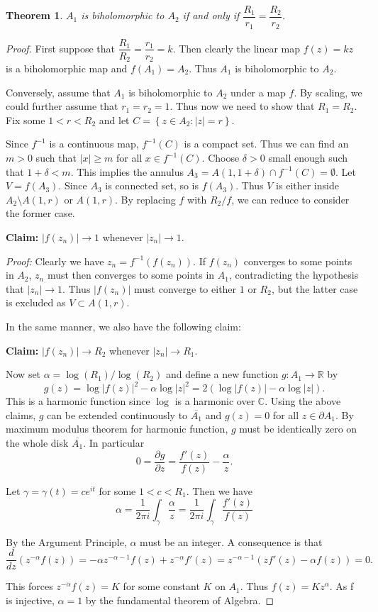 \documentclass[12pt]{article} %
\newtheorem{theorem}{Theorem}
\begin{document}
\begin{theorem}
  $A_1$ is biholomorphic to $A_2$ if and only if $\dfrac{R_1}{r_1} = \dfrac{R_2}{r_2}$.
\end{theorem}
\begin{proof}
  First suppose that $\dfrac{R_1}{R_2} = \dfrac{r_1}{r_2} =k$. Then clearly the linear map $f(z)=kz$
  is a biholomorphic map and $f(A_1) = A_2$. Thus $A_1$ is biholomorphic to $A_2$.

  Conversely, assume that $A_1$ is biholomorphic to $A_2$ under a map $f$. By scaling, we could further assume that $r_1=r_2=1$. Thus now we need to show that $R_1=R_2$.
  Fix some $1<r<R_2$ and let $C = \left\lbrace z \in A_2 \colon |z|=r\right\rbrace$.

  Since $f^{-1}$ is a continuous map, $f^{-1}(C)$ is a compact set. Thus we can find
  an $m>0$ such that $|x| \ge m$ for all $x \in f^{-1}(C)$. Choose $\delta>0$ small enough
  such that $1+\delta<m$. This implies the annulus $A_3 = A(1,1+\delta) \cap f^{-1}(C)=\emptyset$. Let
  $V = f(A_3)$. Since $A_3$ is connected set, so is $f(A_3)$. Thus $V$ is either inside
  $A_2\setminus A(1,r)$ or $A(1,r)$. By replacing $f$ with $R_2/f$, we can reduce to consider the former case.

  \textbf{Claim:} $|f(z_n)| \to 1$ whenever $|z_n| \to 1$.

  \textit{Proof:} Clearly we have $z_n = f^{-1}(f(z_n))$. If $f(z_n)$ converges to some points
  in $A_2$, $z_n$ must then converges to some points in $A_1$, contradicting the hypothesis that
  $|z_n| \to 1$. Thus $|f(z_n)|$ must converge to either $1$ or $R_2$, but the latter case is excluded as $V \subset A(1,r)$.

  In the same manner, we also have the following claim:

  \textbf{Claim:} $|f(z_n)| \to R_2$ whenever $|z_n| \to R_1$.

  Now set $\alpha = \log(R_1)/\log(R_2)$ and define a new function $g \colon A_1 \to \mathbb{R}$ by
  \[g(z) = \log|f(z)|^2 - \alpha\log|z|^2 = 2(\log|f(z)| - \alpha\log|z|).\]
  This is a harmonic function since $\log$ is a harmonic over $\mathbb{C}$. Using the above claims, $g$ can be
  extended continuously to $\overline{A_1}$ and $g(z)=0$ for all $z \in \partial A_1$. By maximum
  modulus theorem for harmonic function, $g$ must be identically zero on the whole disk $\overline{A_1}$.
  In particular
  \[ 0 = \dfrac{\partial g}{\partial z} = \dfrac{f'(z)}{f(z)}-\dfrac{\alpha}{z}.\]

  Let $\gamma = \gamma(t)= ce^{it}$ for some $1<c<R_1$. Then we have
  \[\alpha = \dfrac{1}{2\pi i}\int_{\gamma}\dfrac{\alpha}{z} =\dfrac{1}{2\pi i}\int_{\gamma}\dfrac{f'(z)}{f(z)} \]

  By the Argument Principle, $\alpha$ must be an integer. A consequence is that
  \[\dfrac{d}{dz}(z^{-\alpha}f(z))= -\alpha z^{-\alpha-1}f(z)+z^{-\alpha}f'(z) = z^{-\alpha-1}(zf'(z)-\alpha f(z))=0.\]

  This forces $z^{-\alpha}f(z)=K$ for some constant $K$ on $A_1$. Thus $f(z)=Kz^{\alpha}$. As f is injective, $\alpha=1$ by the fundamental theorem of Algebra.
\end{proof}
\end{document}

